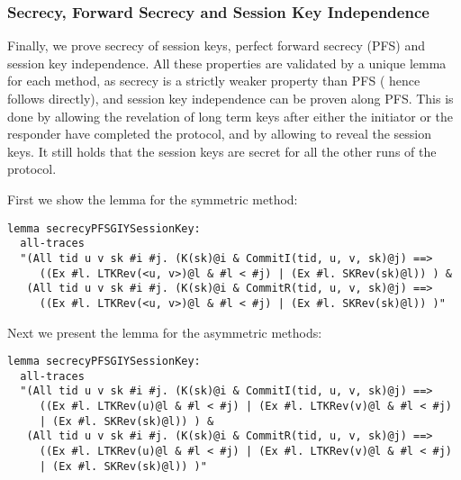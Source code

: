 \subsubsection{Secrecy, Forward Secrecy and Session Key Independence}

Finally, we prove secrecy of session keys, perfect forward secrecy
(PFS) and session key independence. 
%
All these properties are validated by a unique lemma for each method,
as secrecy is a strictly weaker property than PFS ( hence  follows
directly), and session key independence can be proven along PFS.
%
This is done by allowing the revelation of long term keys after either
the initiator or the responder have completed the protocol, and by
allowing to reveal the session keys.
%
It still holds that the session keys are secret for all the other runs
of the protocol.

First we show the lemma for the symmetric method:
\begin{lstlisting}
lemma secrecyPFSGIYSessionKey:
  all-traces
  "(All tid u v sk #i #j. (K(sk)@i & CommitI(tid, u, v, sk)@j) ==>
     ((Ex #l. LTKRev(<u, v>)@l & #l < #j) | (Ex #l. SKRev(sk)@l)) ) &
   (All tid u v sk #i #j. (K(sk)@i & CommitR(tid, u, v, sk)@j) ==>
     ((Ex #l. LTKRev(<u, v>)@l & #l < #j) | (Ex #l. SKRev(sk)@l)) )"
\end{lstlisting}

Next we present the lemma for the asymmetric methods:
\begin{lstlisting}
lemma secrecyPFSGIYSessionKey:
  all-traces
  "(All tid u v sk #i #j. (K(sk)@i & CommitI(tid, u, v, sk)@j) ==>
     ((Ex #l. LTKRev(u)@l & #l < #j) | (Ex #l. LTKRev(v)@l & #l < #j)
     | (Ex #l. SKRev(sk)@l)) ) &
   (All tid u v sk #i #j. (K(sk)@i & CommitR(tid, u, v, sk)@j) ==>
     ((Ex #l. LTKRev(u)@l & #l < #j) | (Ex #l. LTKRev(v)@l & #l < #j)
     | (Ex #l. SKRev(sk)@l)) )"
\end{lstlisting}






